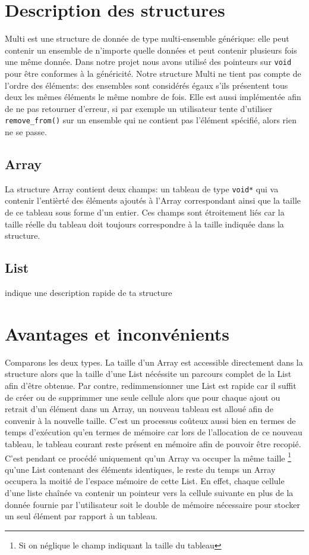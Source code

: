 \documentclass[a4paper, 11pt, oneside]{article}
\begin{document}
	\clearpage
\section{Description des structures}
	Multi est une structure de donnée de type multi-ensemble générique: elle peut contenir un ensemble de n'importe quelle données et peut contenir plusieurs fois une même donnée. Dans notre projet nous avons utilisé des pointeurs sur \texttt{void} pour être conformes à la généricité. Notre structure Multi ne tient pas compte de l'ordre des éléments: des ensembles sont considérés égaux s'ils présentent tous deux les mêmes éléments le même nombre de fois. Elle est aussi implémentée afin de ne pas retourner d'erreur, si par exemple un utilisateur tente d'utiliser \texttt{remove\_from()} sur un ensemble qui ne contient pas l'élément spécifié, alors rien ne se passe.
	\subsection{Array}
		La structure Array contient deux champs: un tableau de type \texttt{void*} qui va contenir l'entièrté des éléments ajoutés à l'Array correspondant ainsi que la taille de ce tableau sous forme d'un entier. Ces champs sont étroitement liés car la taille réelle du tableau doit toujours correspondre à la taille indiquée dans la structure.
	\subsection{List}
		\color{blue} indique une description rapide de ta structure \color{black}
	
\section{Avantages et inconvénients}
	Comparons les deux types. La taille d'un Array est accessible directement dans la structure alors que la taille d'une List nécéssite un parcours complet de la List afin d'être obtenue. Par contre, redimmensionner une List est rapide car il suffit de créer ou de supprimmer une seule cellule alors que pour chaque ajout ou retrait d'un élément dans un Array, un nouveau tableau est alloué afin de convenir à la nouvelle taille. C'est un processus coûteux aussi bien en termes de temps d'exécution qu'en termes de mémoire car lors de l'allocation de ce nouveau tableau, le tableau courant reste présent en mémoire afin de pouvoir être recopié. C'est pendant ce procédé uniquement qu'un Array va occuper la même taille \footnote{Si on néglique le champ indiquant la taille du tableau} qu'une List contenant des éléments identiques, le reste du temps un Array occupera la moitié de l'espace mémoire de cette List. En effet, chaque cellule d'une liste chaînée va contenir un pointeur vers la cellule suivante en plus de la donnée fournie par l'utilisateur soit le double de mémoire nécessaire pour stocker un seul élément par rapport à un tableau.
	
\end{document}
